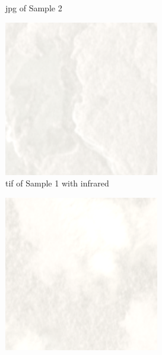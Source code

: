 \documentclass[10pt,twocolumn,letterpaper]{article}
\begin{document}
\begin{figure}
\begin{subfigure}{.5\columnwidth}
\caption{jpg of Sample 2}
\end{subfigure}
\begin{subfigure}{.5\columnwidth}
\includegraphics[width=0.9\columnwidth]{sample_images/train_1_tif.png}
\caption{tif of Sample 1 with infrared}
\end{subfigure}%
\begin{subfigure}{.5\columnwidth}
\includegraphics[width=0.9\columnwidth]{sample_images/train_1000_tif.png}

\end{subfigure}
\end{figure}
\end{document}
